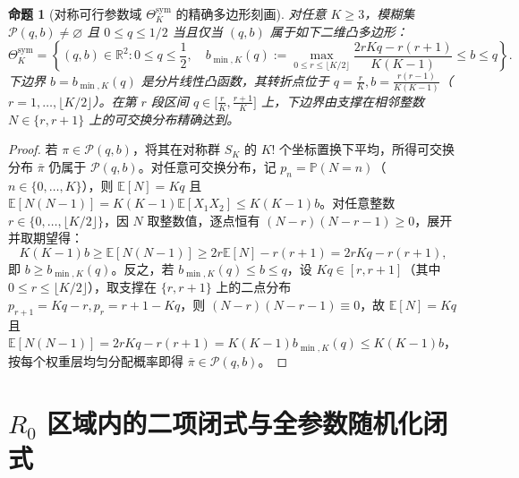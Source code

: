 \documentclass[11pt,a4paper]{article}
\newtheorem{proposition}[theorem]{命题}
\theoremstyle{definition}
\theoremstyle{remark}
\newcommand{\Thetasym}{\Theta^{\mathrm{sym}}_K}
\begin{document}
\begin{proposition}[对称可行参数域 $\Thetasym$ 的精确多边形刻画]\label{prop:feasible_domain}
对任意 $K \ge 3$，模糊集 $\mathcal{P}(q, b) \neq \varnothing$ 且 $0 \le q \le 1/2$ 当且仅当 $(q, b)$ 属于如下二维凸多边形：
\begin{equation}\label{eq:Theta_sym}
  \boxed{\Thetasym = \left\{ (q, b) \in \mathbb{R}^2 : 0 \le q \le \frac{1}{2},\quad b_{\min, K}(q) := \max_{0 \le r \le \lfloor K/2 \rfloor} \frac{2r K q - r(r+1)}{K(K-1)} \le b \le q \right\}.}
\end{equation}
下边界 $b = b_{\min, K}(q)$ 是分片线性凸函数，其转折点位于 $q = \frac{r}{K}, b = \frac{r(r-1)}{K(K-1)}$（$r = 1, \dots, \lfloor K/2 \rfloor$）。在第 $r$ 段区间 $q \in \bigl[\frac{r}{K}, \frac{r+1}{K}\bigr]$ 上，下边界由支撑在相邻整数 $N \in \{r, r+1\}$ 上的可交换分布精确达到。
\end{proposition}
\begin{proof}
若 $\pi \in \mathcal{P}(q, b)$，将其在对称群 $S_K$ 的 $K!$ 个坐标置换下平均，所得可交换分布 $\bar{\pi}$ 仍属于 $\mathcal{P}(q, b)$。对任意可交换分布，记 $p_n = \mathbb{P}(N = n)$（$n \in \{0, \dots, K\}$），则 $\mathbb{E}[N] = Kq$ 且 $\mathbb{E}[N(N-1)] = K(K-1)\mathbb{E}[X_1 X_2] \le K(K-1)b$。对任意整数 $r \in \{0, \dots, \lfloor K/2 \rfloor\}$，因 $N$ 取整数值，逐点恒有 $(N - r)(N - r - 1) \ge 0$，展开并取期望得：
\[
  K(K-1)b \ge \mathbb{E}[N(N-1)] \ge 2r\mathbb{E}[N] - r(r+1) = 2rKq - r(r+1),
\]
即 $b \ge b_{\min, K}(q)$。反之，若 $b_{\min, K}(q) \le b \le q$，设 $Kq \in [r, r+1]$（其中 $0 \le r \le \lfloor K/2 \rfloor$），取支撑在 $\{r, r+1\}$ 上的二点分布 $p_{r+1} = Kq - r, p_r = r + 1 - Kq$，则 $(N-r)(N-r-1) \equiv 0$，故 $\mathbb{E}[N] = Kq$ 且 $\mathbb{E}[N(N-1)] = 2rKq - r(r+1) = K(K-1)b_{\min, K}(q) \le K(K-1)b$，按每个权重层均匀分配概率即得 $\bar{\pi} \in \mathcal{P}(q, b)$。
\end{proof}

\section{$R_0$ 区域内的二项闭式与全参数随机化闭式}
\end{document}
